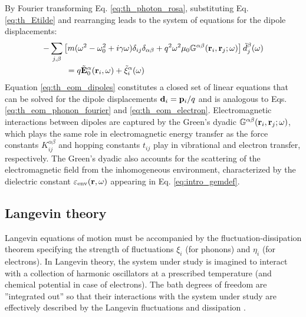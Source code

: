 By Fourier transforming Eq. \eqref{eq:th_photon_rosa}, substituting Eq. \eqref{eq:th_Etilde} and rearranging leads to the system of equations for the dipole displacements:
\begin{alignat}{2}
 - & \sum_{j,\beta} \left[m(\omega^2-\omega_0^2+i\gamma\omega) \delta_{ij}\delta_{\alpha\beta} +q^2 \omega^2 \mu_0 \mathbb{G}^{\alpha\beta}(\mathbf{r}_i,\mathbf{r}_j;\omega) \right]\tilde d_j^{\beta}(\omega) \notag \\
  &\qquad = q\tilde{\mathbf{E}}_0^{\alpha}(\mathbf{r}_i,\omega) + \tilde{\xi}_i^{\alpha}(\omega) \label{eq:th_eom_dipoles}
\end{alignat}
Equation \eqref{eq:th_eom_dipoles} constitutes a closed set of linear equations that can be solved for the dipole displacements $\mathbf{d}_i=\mathbf{p}_i/q$ and is analogous to Eqs. \eqref{eq:th_eom_phonon_fourier} and \eqref{eq:th_eom_electron}. Electromagnetic interactions between dipoles are captured by the Green's dyadic $\mathbb{G}^{\alpha\beta}(\mathbf{r}_i,\mathbf{r}_j;\omega)$, which plays the same role in electromagnetic energy transfer as the force constants $K_{ij}^{\alpha\beta}$ and hopping constants $t_{ij}$ play in vibrational and electron transfer, respectively. The Green's dyadic also accounts for the scattering of the electromagnetic field from the inhomogeneous environment, characterized by the dielectric constant $\varepsilon_{\textrm{env}}(\mathbf{r},\omega)$ appearing in Eq. \eqref{eq:intro_gemdef}.




\subsection{Langevin theory}
\label{sec:th_langevin}
Langevin equations of motion must be accompanied by the fluctuation-dissipation theorem specifying the strength of fluctuations $\xi_i$ (for phonons) and $\eta_i$ (for electrons). In Langevin theory, the system under study is imagined to interact with a collection of harmonic oscillators at a prescribed temperature (and chemical potential in case of electrons). The bath degrees of freedom are ''integrated out'' so that their interactions with the system under study are effectively described by the Langevin fluctuations and dissipation \cite{weiss}. 

